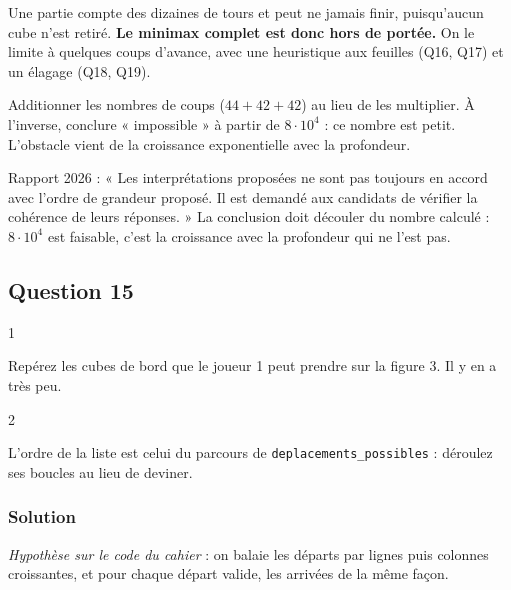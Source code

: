 \documentclass[11pt,a4paper]{article}
\begin{document}
Une partie compte des dizaines de tours et peut ne jamais finir, puisqu'aucun cube n'est retiré. \textbf{Le minimax complet est donc hors de portée.} On le limite à quelques coups d'avance, avec une heuristique aux feuilles (Q16, Q17) et un élagage (Q18, Q19).

\begin{piege}

Additionner les nombres de coups (\(44+42+42\)) au lieu de les multiplier. À l'inverse, conclure « impossible » à partir de \(8\cdot10^4\) : ce nombre est petit. L'obstacle vient de la croissance exponentielle avec la profondeur.

\end{piege}

\begin{jury}

Rapport 2026 : « Les interprétations proposées ne sont pas toujours en accord avec l'ordre de grandeur proposé. Il est demandé aux candidats de vérifier la cohérence de leurs réponses. » La conclusion doit découler du nombre calculé : \(8\cdot10^4\) est faisable, c'est la croissance avec la profondeur qui ne l'est pas.

\end{jury}

\hypertarget{question-15}{%
\subsection{Question 15}\label{question-15}}

\begin{indication}{1}

Repérez les cubes de bord que le joueur 1 peut prendre sur la figure 3. Il y en a très peu.

\end{indication}

\begin{indication}{2}

L'ordre de la liste est celui du parcours de \texttt{deplacements\_possibles} : déroulez ses boucles au lieu de deviner.

\end{indication}

\hypertarget{solution-14}{%
\subsubsection{Solution}\label{solution-14}}

\emph{Hypothèse sur le code du cahier} : on balaie les départs par lignes puis colonnes croissantes, et pour chaque départ valide, les arrivées de la même façon.
\end{document}
